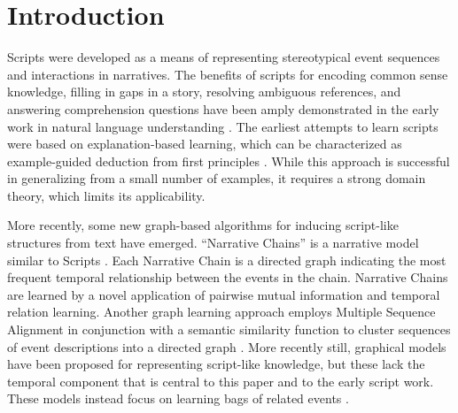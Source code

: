 \documentclass[letterpaper]{article}
\begin{document}
\section{Introduction}
\vspace{-.05in}
Scripts were developed as a means of representing stereotypical event sequences and interactions in narratives. %
The benefits of scripts for encoding common sense knowledge, 
filling in gaps in a story, resolving 
ambiguous references, and answering comprehension 
questions have been amply demonstrated in the early work 
in natural language understanding \cite{schank1977scripts}. 
The earliest attempts to learn scripts were based on
 explanation-based learning, which can be characterized as example-guided deduction from first principles \cite{dejong1981,dejong1986EBL}. %
While this approach is successful in generalizing from a small number of examples, it requires a strong domain theory, which limits its applicability. 

More recently, some new graph-based algorithms for inducing script-like structures from text have emerged.  ``Narrative Chains'' is a narrative model similar to Scripts \cite{chambers2008unsupervised}. Each Narrative Chain is a directed graph indicating the most frequent temporal relationship between the events in the chain. Narrative Chains are learned by a novel application of pairwise mutual information and temporal relation learning. %
Another graph learning approach employs Multiple Sequence Alignment in conjunction with a semantic similarity function to cluster sequences of event descriptions into a directed graph \cite{regneri2010learning}. More recently still, graphical models have been proposed for representing script-like knowledge, but these lack the temporal component that is central to this paper and to the early script work. These models instead focus on learning bags of related events \cite{chambers2013event,kit2013probabilistic}.
\end{document}
